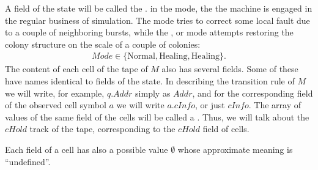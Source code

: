 \documentclass[12pt]{memoir}
\newcommand{\fld}[1]{\ensuremath{\textit{#1}}}
\newcommand{\Addr}{\fld{Addr}}
\newcommand{\cHold}{\fld{cHold}}
\newcommand{\cInfo}{\fld{cInfo}}
\newcommand{\Mode}{\fld{Mode}}
\newcommand{\Rebuilding}{\mathrm{Healing}}
\newcommand{\Normal}{\mathrm{Normal}}
\newcommand{\Healing}{\mathrm{Healing}}
\begin{document}
A field of the state will be called the .
in the  mode, the the machine is engaged 
in the regular business of simulation.
The  mode tries to correct some local fault due to a couple of neighboring
bursts, while the , or  mode attempts restoring the colony structure
on the scale of a couple of colonies:
 \begin{align*}
   \Mode\in\{ \Normal,\Healing, \Rebuilding \}.
 \end{align*}
The content of each cell of the tape of \( M \) also has several fields.
Some of these have names identical to fields of the state.
In describing the transition rule of \( M \) we will write, for example,
\( q.\Addr \) simply as \( \Addr \), and for the corresponding field of the
observed cell symbol \( a \) we will write \( a.\cInfo \), or just \( \cInfo \).
The array of values of the same field of the cells will be called a .
Thus, we will talk about the \( \cHold \) track of the tape, corresponding to the
\( \cHold \) field of cells.

Each field of a cell has also a possible value
\( \emptyset \) whose approximate meaning is ``undefined''.
\end{document}
